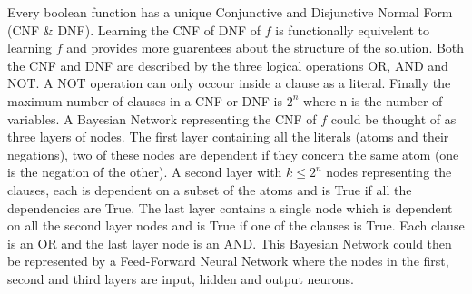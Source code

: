 Every boolean function has a unique Conjunctive and Disjunctive Normal Form (CNF \& DNF). Learning the CNF of DNF of $f$ is functionally equivelent to learning $f$ and provides more guarentees about the structure of the solution. Both the CNF and DNF are described by the three logical operations OR, AND and NOT. A NOT operation can only occour inside a clause as a literal. Finally the maximum number of clauses in a CNF or DNF is $2^n$ where n is the number of variables. A Bayesian Network representing the CNF of $f$ could be thought of as three layers of nodes. The first layer containing all the literals (atoms and their negations), two of these nodes are dependent if they concern the same atom (one is the negation of the other). A second layer with $k \leq 2^n$ nodes representing the clauses, each is dependent on a subset of the atoms and is True if all the dependencies are True. The last layer contains a single node which is dependent on all the second layer nodes and is True if one of the clauses is True. Each clause is an OR and the last layer node is an AND. This Bayesian Network could then be represented by a Feed-Forward Neural Network where the nodes in the first, second and third layers are input, hidden and output neurons.

